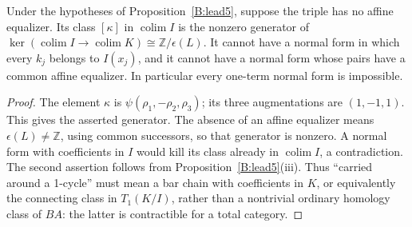 \begin{corollary}
\label{B:mixed-cycle-obstruction}
Under the hypotheses of Proposition~\ref{B:lead5}, suppose the triple
has no affine equalizer.  Its class $[\kappa]$ in
$\operatorname{colim}I$ is the nonzero generator of
$\ker(\operatorname{colim}I\to\operatorname{colim}K)
\cong\mathbb Z/\epsilon(L)$.
It cannot have a normal form in which every $k_j$ belongs to $I(x_j)$,
and it cannot have a normal form whose pairs have a common affine
equalizer.  In particular every one-term normal form is impossible.
\end{corollary}
\begin{proof}
The element $\kappa$ is $\psi(\rho_1,-\rho_2,\rho_3)$; its three
augmentations are $(1,-1,1)$.  This gives the asserted generator.
The absence of an affine equalizer means
$\epsilon(L)\ne\mathbb Z$, using common successors, so that
generator is nonzero.  A normal form with coefficients in $I$ would
kill its class already in $\operatorname{colim}I$, a contradiction.
The second assertion follows from Proposition~\ref{B:lead5}(iii).
Thus ``carried around a 1-cycle'' must mean a bar chain with
coefficients in $K$, or equivalently the connecting class in
$T_1(K/I)$, rather than a nontrivial ordinary homology class of $BA$:
the latter is contractible for a total category.
\end{proof}
